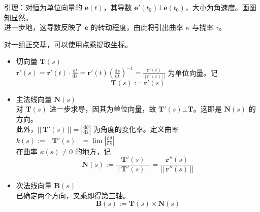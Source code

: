 \documentclass[12pt, a4paper, UTF8, openany]{ctexbook}
\newcommand{\dif}{\mathrm{d}}
\newcommand{\mat}[1]{\mathbf{#1}}
\newcommand{\len}[1]{||\, #1 \,||}%
\begin{document}
        {\heiti 引理}：对恒为单位向量的 $\mat{e}(t)$，其导数 $\mat{e}'(t_0) \bot \mat{e}(t_0)$，大小为角速度。画图知显然。\\
        进一步地，这导数反映了 $\mat{e}$ 的转动程度，由此将引出曲率 $\kappa$ 与挠率 $\tau$。

        对一组正交基，可以{\heiti 使用点乘提取坐标}。

        \begin{itemize}
            \item 切向量 $\mat{T}(s)$ \\
                $\mat{r}'(s) = \mat{r}'(t) \cdot \frac{\dif t}{\dif s} = \mat{r}'(t) (\frac{\dif s}{\dif t})^{-1} = \frac{\mat{r}'(t)}{\len{\mat{r}'(t)}}$ 为单位向量。记
                $$\mat{T}(s) := \mat{r}'(s)$$
            \item 主法线向量 $\mat{N}(s)$ \\
                对 $\mat{T}(s)$ 进一步求导，因其为单位向量，故 $\mat{T}'(s) \bot \mat{T}$。这即是 $\mat{N}(s)$ 的方向。\\
                此外，$\len{\mat{T}'(s)} = |\frac{\dif \theta}{\dif s}|$ 为角度的变化率。定义曲率 $k(s) := \len{\mat{T}'(s)} = \lim |\frac{\dif \theta}{\dif s}|$ \\
                在曲率 $\kappa(s) \neq 0$ 的地方，记
                $$\mat{N}(s) := \frac{\mat{T}'(s)}{\len{\mat{T}'(s)}} = \frac{\mat{r}''(s)}{\len{\mat{r}''(s)}}$$
            \item 次法线向量 $\mat{B}(s)$ \\
                已确定两个方向，叉乘即得第三轴。
                $$\mat{B}(s) := \mat{T}(s) \times \mat{N}(s)$$
        \end{itemize}
\end{document}
